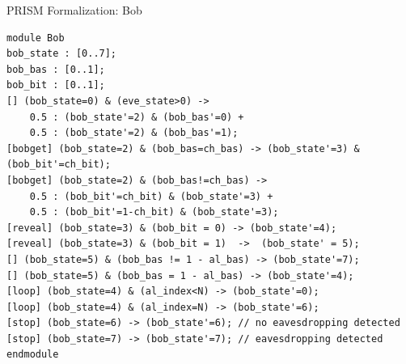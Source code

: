 \documentclass{beamer}
\begin{document}
\begin{frame}[fragile]{PRISM Formalization: Bob}
\begin{scriptsize}
\begin{verbatim}
module Bob
bob_state : [0..7];
bob_bas : [0..1];
bob_bit : [0..1];
[] (bob_state=0) & (eve_state>0) -> 
    0.5 : (bob_state'=2) & (bob_bas'=0) +
    0.5 : (bob_state'=2) & (bob_bas'=1);
[bobget] (bob_state=2) & (bob_bas=ch_bas) -> (bob_state'=3) & (bob_bit'=ch_bit);
[bobget] (bob_state=2) & (bob_bas!=ch_bas) -> 
    0.5 : (bob_bit'=ch_bit) & (bob_state'=3) +
    0.5 : (bob_bit'=1-ch_bit) & (bob_state'=3);
[reveal] (bob_state=3) & (bob_bit = 0) -> (bob_state'=4);
[reveal] (bob_state=3) & (bob_bit = 1)  ->  (bob_state' = 5);
[] (bob_state=5) & (bob_bas != 1 - al_bas) -> (bob_state'=7);
[] (bob_state=5) & (bob_bas = 1 - al_bas) -> (bob_state'=4);
[loop] (bob_state=4) & (al_index<N) -> (bob_state'=0);
[loop] (bob_state=4) & (al_index=N) -> (bob_state'=6);
[stop] (bob_state=6) -> (bob_state'=6); // no eavesdropping detected
[stop] (bob_state=7) -> (bob_state'=7); // eavesdropping detected
endmodule
\end{verbatim}
\end{scriptsize}
\end{frame}

\end{document}
